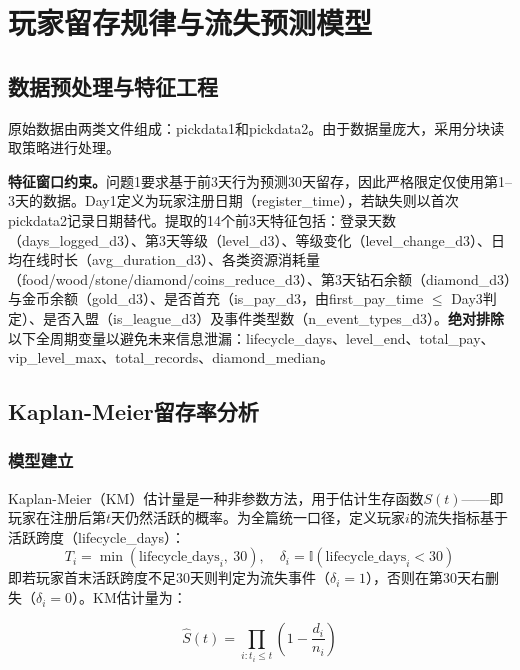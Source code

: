 \section{玩家留存规律与流失预测模型}

\subsection{数据预处理与特征工程}

原始数据由两类文件组成：pickdata1和pickdata2。由于数据量庞大，采用分块读取策略进行处理。

\textbf{特征窗口约束。}问题1要求基于前3天行为预测30天留存，因此严格限定仅使用第1--3天的数据。Day1定义为玩家注册日期（register\_time），若缺失则以首次pickdata2记录日期替代。提取的14个前3天特征包括：登录天数（days\_logged\_d3）、第3天等级（level\_d3）、等级变化（level\_change\_d3）、日均在线时长（avg\_duration\_d3）、各类资源消耗量（food/wood/stone/diamond/coins\_reduce\_d3）、第3天钻石余额（diamond\_d3）与金币余额（gold\_d3）、是否首充（is\_pay\_d3，由first\_pay\_time $\leq$ Day3判定）、是否入盟（is\_league\_d3）及事件类型数（n\_event\_types\_d3）。\textbf{绝对排除}以下全周期变量以避免未来信息泄漏：lifecycle\_days、level\_end、total\_pay、vip\_level\_max、total\_records、diamond\_median。

\subsection{Kaplan-Meier留存率分析}

\subsubsection{模型建立}

Kaplan-Meier（KM）估计量\cite{kaplan1958}是一种非参数方法，用于估计生存函数$S(t)$——即玩家在注册后第$t$天仍然活跃的概率。为全篇统一口径，定义玩家$i$的流失指标基于活跃跨度（lifecycle\_days）：
\begin{equation}
T_i = \min(\text{lifecycle\_days}_i,\ 30),\quad \delta_i = \mathbb{I}(\text{lifecycle\_days}_i < 30)
\end{equation}
即若玩家首末活跃跨度不足30天则判定为流失事件（$\delta_i=1$），否则在第30天右删失（$\delta_i=0$）\cite{kleinbaum2012}。KM估计量为：

\begin{equation}\label{eq:km}
\hat{S}(t) = \prod_{i: t_i \leq t} \left(1 - \frac{d_i}{n_i}\right)
\end{equation}

